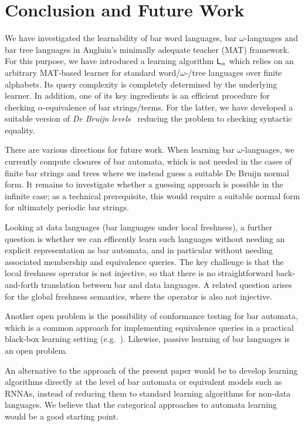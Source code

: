 \documentclass[a4paper,UKenglish,cleveref,autoref,thm-restate,numberwithinsect,final]{lipics-v2021}
\begin{document}
    \section{Conclusion and Future Work}\label{sec:concl}

    We have investigated the learnability of bar word languages, bar $\omega$-languages and bar tree languages in Angluin's minimally adequate teacher (MAT) framework. For this purpose, we
    have introduced a learning algorithm $\textsf{L}_\alpha$ which relies on an arbitrary MAT-based learner for
    standard word/$\omega$-/tree languages over finite alphabets. Its query complexity is completely determined by
    the underlying learner.
    In addition, one of its key ingredients is an efficient procedure for checking
    $\alpha$-equivalence of bar strings/terms. For the latter, we have developed a suitable
    version of \emph{De Bruijn levels}~\cite{db72} reducing the problem to checking syntactic
    equality.

    There are various directions for future work. When learning bar $\omega$-languages, we 
    currently compute closures of bar automata, which is not needed in the cases of finite bar strings and trees where we instead guess a suitable De Bruijn normal form. It remains to investigate whether a guessing approach is possible in the infinite case; as a technical prerequisite, this would require a suitable normal form for ultimately periodic bar strings.

    Looking at data languages (bar languages under local
    freshness), a further question is whether we can efficently learn such languages without needing an explicit representation
    as bar automata, and in particular without needing associated membership and equivalence queries. 
	The key challenge is that the local freshness operator is not injective, so that there is no straightforward back-and-forth translation between bar and data languages. A related question arises for the
     global freshness semantics, where the operator is also not injective.
    
Another open problem is the possibility of conformance testing for bar automata, which is a common approach for implementing equivalence queries in a practical black-box learning setting (e.g.~\cite{DBLP:journals/cacm/Vaandrager17}). 
	Likewise, passive learning of bar languages is an open problem.

	 An alternative to the approach of the present paper would be to develop learning algorithms directly
	at the level of bar automata or equivalent models such as RNNAs, instead of reducing
	them to standard learning algorithms for non-data languages. We believe that the categorical
	approaches to automata learning~\cite{us20,hkrss22} would be a good starting point. 
	
\end{document}
